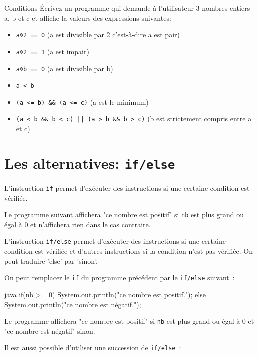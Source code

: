 \documentclass[a4paper,11pt]{article}
\begin{document}
	\begin{Exercice}{Conditions}
		\'Ecrivez un programme qui demande à l'utilisateur 
		3 nombres entiers a, b et c et affiche la valeurs des expressions suivantes:
		\begin{itemize}
			\item \texttt{a\%2 == 0}  (a est divisible par 2 c'est-à-dire a est pair)
			\item \texttt{a\%2 == 1}  (a est impair)
			\item \texttt{a\%b == 0}  (a est divisible par b)
			\item \texttt{a < b}
			\item \texttt{(a <= b) \&\& (a <= c)} (a est le minimum)
			\item \texttt{(a < b \&\& b < c) || (a > b \&\& b > c)} (b est strictement compris entre a et c)
		\end{itemize}
	\end{Exercice}


\section{Les alternatives: \texttt{if/else}}

	L'instruction \texttt{if} permet d'exécuter des instructions si une certaine condition est vérifiée.
	
	Le programme suivant affichera "ce nombre est positif" 
	si \texttt{nb} est plus grand ou égal à 0 et n'affichera rien dans le cas contraire.
	 

	L'instruction \texttt{if/else} permet d'exécuter des instructions si une certaine condition est vérifiée
	et d'autres instructions si la condition n'est pas vérifiée. On peut traduire 'else' par 'sinon'.
	
	On peut remplacer le \texttt{if} du programme précédent par le \texttt{if/else} suivant~:
	
	\begin{Code}{java}
		if(nb >= 0) {
			System.out.println("ce nombre est positif.");
		} else {
			System.out.println("ce nombre est négatif.");
		}
	\end{Code}

	Le programme affichera "ce nombre est positif" 
	si \texttt{nb} est plus grand ou égal à 0 et "ce nombre est négatif" sinon.


	Il est aussi possible d'utiliser une succession de \texttt{if/else}~:
		
\end{document}
